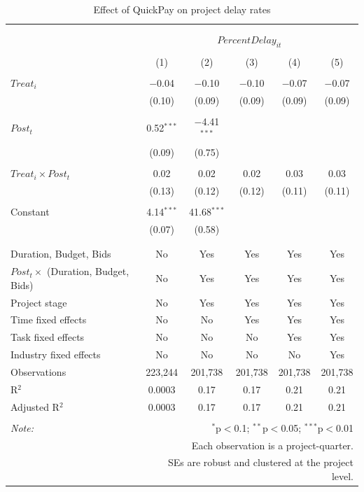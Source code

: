\documentclass[
]{article}
\begin{document}
\begin{table}[H] \centering 
  \caption{Effect of QuickPay on project delay rates} 
  \label{} 
\small 
\begin{tabular}{@{\extracolsep{-2pt}}lccccc} 
\\[-1.8ex]\hline 
\hline \\[-1.8ex] 
\\[-1.8ex] & \multicolumn{5}{c}{$PercentDelay_{it}$} \\ 
\\[-1.8ex] & (1) & (2) & (3) & (4) & (5)\\ 
\hline \\[-1.8ex] 
 $Treat_i$ & $-$0.04 & $-$0.10 & $-$0.10 & $-$0.07 & $-$0.07 \\ 
  & (0.10) & (0.09) & (0.09) & (0.09) & (0.09) \\ 
  & & & & & \\ 
 $Post_t$ & 0.52$^{***}$ & $-$4.41$^{***}$ &  &  &  \\ 
  & (0.09) & (0.75) &  &  &  \\ 
  & & & & & \\ 
 $Treat_i \times Post_t$ & 0.02 & 0.02 & 0.02 & 0.03 & 0.03 \\ 
  & (0.13) & (0.12) & (0.12) & (0.11) & (0.11) \\ 
  & & & & & \\ 
 Constant & 4.14$^{***}$ & 41.68$^{***}$ &  &  &  \\ 
  & (0.07) & (0.58) &  &  &  \\ 
  & & & & & \\ 
\hline \\[-1.8ex] 
Duration, Budget, Bids & No & Yes & Yes & Yes & Yes \\ 
$Post_t \times$  (Duration, Budget, Bids) & No & Yes & Yes & Yes & Yes \\ 
Project stage & No & Yes & Yes & Yes & Yes \\ 
Time fixed effects & No & No & Yes & Yes & Yes \\ 
Task fixed effects & No & No & No & Yes & Yes \\ 
Industry fixed effects & No & No & No & No & Yes \\ 
Observations & 223,244 & 201,738 & 201,738 & 201,738 & 201,738 \\ 
R$^{2}$ & 0.0003 & 0.17 & 0.17 & 0.21 & 0.21 \\ 
Adjusted R$^{2}$ & 0.0003 & 0.17 & 0.17 & 0.21 & 0.21 \\ 
\hline 
\hline \\[-1.8ex] 
\textit{Note:}  & \multicolumn{5}{r}{$^{*}$p$<$0.1; $^{**}$p$<$0.05; $^{***}$p$<$0.01} \\ 
 & \multicolumn{5}{r}{Each observation is a project-quarter.} \\ 
 & \multicolumn{5}{r}{SEs are robust and clustered at the project level.} \\ 
\end{tabular} 
\end{table}
\end{document}
